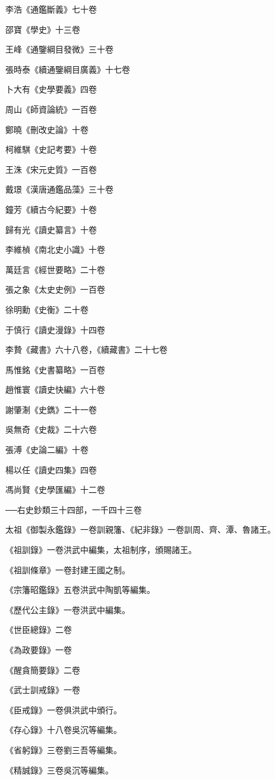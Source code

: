 李浩《通鑑斷義》七十卷

邵寶《學史》十三卷

王峰《通鑒綱目發微》三十卷

張時泰《續通鑒綱目廣義》十七卷

卜大有《史學要義》四卷

周山《師資論統》一百卷

鄭曉《刪改史論》十卷

柯維騏《史記考要》十卷

王洙《宋元史質》一百卷

戴璟《漢唐通鑑品藻》三十卷

鐘芳《續古今紀要》十卷

歸有光《讀史纂言》十卷

李維楨《南北史小識》十卷

萬廷言《經世要略》二十卷

張之象《太史史例》一百卷

徐明勳《史衡》二十卷

于慎行《讀史漫錄》十四卷

李贄《藏書》六十八卷，《續藏書》二十七卷

馬惟銘《史書纂略》一百卷

趙惟寰《讀史快編》六十卷

謝肇淛《史鐫》二十一卷

吳無奇《史裁》二十六卷

張溥《史論二編》十卷

楊以任《讀史四集》四卷

馮尚賢《史學匯編》十二卷

──右史鈔類三十四部，一千四十三卷

太祖《御製永鑑錄》一卷訓親籓、《紀非錄》一卷訓周、齊、潭、魯諸王。

《祖訓錄》一卷洪武中編集，太祖制序，頒賜諸王。

《祖訓條章》一卷封建王國之制。

《宗籓昭鑑錄》五卷洪武中陶凱等編集。

《歷代公主錄》一卷洪武中編集。

《世臣總錄》二卷

《為政要錄》一卷

《醒貪簡要錄》二卷

《武士訓戒錄》一卷

《臣戒錄》一卷俱洪武中頒行。

《存心錄》十八卷吳沉等編集。

《省躬錄》三卷劉三吾等編集。

《精誠錄》三卷吳沉等編集。

